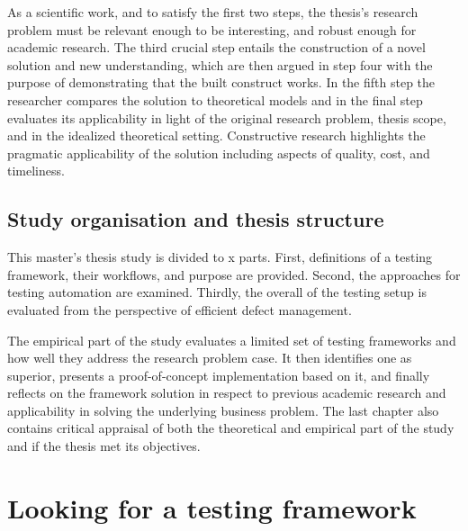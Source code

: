 \documentclass[12pt,a4paper,oneside,pdftex]{report}
\begin{document}
As a scientific work, and to satisfy the first two steps, the thesis's research problem must be relevant enough to be interesting, and robust enough for academic research. The third crucial step entails the construction of a novel solution and new understanding, which are then argued in step four with the purpose of demonstrating that the built construct works. In the fifth step the researcher compares the solution to theoretical models and in the final step evaluates its applicability in light of the original research problem, thesis scope, and in the idealized theoretical setting. Constructive research highlights the pragmatic applicability of the solution including aspects of quality, cost, and timeliness.

\begin{comment}
Below to reference works from SoberIT slideset.

Kasanen, Eero, Lukka Kari, and Arto Siitonen. 1993. The Constructive Approach in Management Accounting Research. Journal of Management Accounting Research, 5 (1), pp. 243-263.

Shaw, M. 2001. The Coming-of-Age of Software Architecture Research. Proceedings of ICSE-2001, pp. 657-664. Los Alamitos, CA: IEEE Computer Society Press.
\end{comment}

\section{Study organisation and thesis structure}
\label{section:structure}
This master's thesis study is divided to x parts. First, definitions of a testing framework, their workflows, and purpose are provided. Second, the approaches for testing automation are examined. Thirdly, the overall of the testing setup is evaluated from the perspective of efficient defect management. 

The empirical part of the study evaluates a limited set of testing frameworks and how well they address the research problem case. It then identifies one as superior, presents a proof-of-concept implementation based on it, and finally reflects on the framework solution in respect to previous academic research and applicability in solving the underlying business problem. The last chapter also contains critical appraisal of both the theoretical and empirical part of the study and if the thesis met its objectives.

\chapter{Looking for a testing framework}
\label{chapter:framework}
\end{document}
